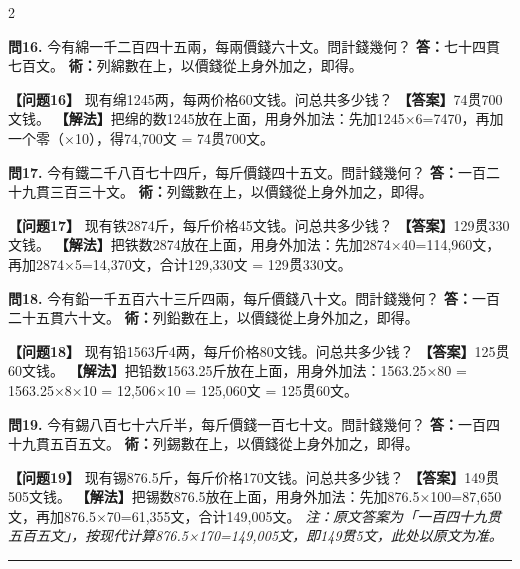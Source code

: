 \documentclass[11pt,a4paper]{article}
\newcommand{\longline}{\noindent\rule{\textwidth}{0.4pt}}
\begin{document}
\begin{paracol}{2}
\switchcolumn*

\textbf{問16.} 今有綿一千二百四十五兩，每兩價錢六十文。問計錢幾何？\break
\textbf{答：}七十四貫七百文。\break
\textbf{術：}列綿數在上，以價錢從上身外加之，即得。

\switchcolumn

\textbf{【问题16】} 现有绵1245两，每两价格60文钱。问总共多少钱？\break
\textbf{【答案】}74贯700文钱。\break
\textbf{【解法】}把绵的数1245放在上面，用身外加法：先加1245×6=7470，再加一个零（×10），得74,700文 = 74贯700文。

\switchcolumn*

\textbf{問17.} 今有鐵二千八百七十四斤，每斤價錢四十五文。問計錢幾何？\break
\textbf{答：}一百二十九貫三百三十文。\break
\textbf{術：}列鐵數在上，以價錢從上身外加之，即得。

\switchcolumn

\textbf{【问题17】} 现有铁2874斤，每斤价格45文钱。问总共多少钱？\break
\textbf{【答案】}129贯330文钱。\break
\textbf{【解法】}把铁数2874放在上面，用身外加法：先加2874×40=114,960文，再加2874×5=14,370文，合计129,330文 = 129贯330文。

\switchcolumn*

\textbf{問18.} 今有鉛一千五百六十三斤四兩，每斤價錢八十文。問計錢幾何？\break
\textbf{答：}一百二十五貫六十文。\break
\textbf{術：}列鉛數在上，以價錢從上身外加之，即得。

\switchcolumn

\textbf{【问题18】} 现有铅1563斤4两，每斤价格80文钱。问总共多少钱？\break
\textbf{【答案】}125贯60文钱。\break
\textbf{【解法】}把铅数1563.25斤放在上面，用身外加法：1563.25×80 = 1563.25×8×10 = 12,506×10 = 125,060文 = 125贯60文。

\switchcolumn*

\textbf{問19.} 今有錫八百七十六斤半，每斤價錢一百七十文。問計錢幾何？\break
\textbf{答：}一百四十九貫五百五文。\break
\textbf{術：}列錫數在上，以價錢從上身外加之，即得。

\switchcolumn

\textbf{【问题19】} 现有锡876.5斤，每斤价格170文钱。问总共多少钱？\break
\textbf{【答案】}149贯505文钱。\break
\textbf{【解法】}把锡数876.5放在上面，用身外加法：先加876.5×100=87,650文，再加876.5×70=61,355文，合计149,005文。\break
\textit{注：原文答案为「一百四十九贯五百五文」，按现代计算876.5×170=149,005文，即149贯5文，此处以原文为准。}

\end{paracol}

\longline
\end{document}
